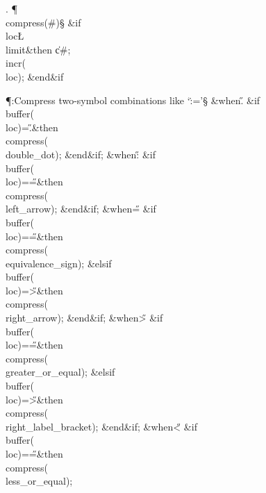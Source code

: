 .
\Y\P\4\D\\{compress}\?\1(\?\#\?\2)\S\?\6
\&{if}\1\1\8\\{loc}\?\L\?\\{limit}\2\8\&{then}\6
\|c\?\K\?\#;\5
\\{incr}\?\1(\?\\{loc}\?\2)\?;\2\6
\&{end}\8\2\&{if}\1\par
\Y\P\?\4:Compress two-symbol combinations like `\.{:=}'\X\S\?\6
\4\&{when}\8\H{.}\KR\6
\&{if}\1\1\8\\{buffer}\?\1(\?\\{loc}\?\2)=\?\H{.}\2\8\&{then}\6
\\{compress}\?\1(\?\\{double\_dot}\?\2)\?;\2\6
\&{end}\8\2\&{if}\1;\6
\4\&{when}\8\H{:}\KR\6
\&{if}\1\1\8\\{buffer}\?\1(\?\\{loc}\?\2)=\?\H{=}\2\8\&{then}\6
\\{compress}\?\1(\?\\{left\_arrow}\?\2)\?;\2\6
\&{end}\8\2\&{if}\1;\6
\4\&{when}\8\H{=}\KR\6
\&{if}\1\1\8\\{buffer}\?\1(\?\\{loc}\?\2)=\?\H{=}\2\8\&{then}\6
\\{compress}\?\1(\?\\{equivalence\_sign}\?\2)\?;\6
\4\&{elsif}\1\8\\{buffer}\?\1(\?\\{loc}\?\2)=\?\H{>}\2\8\&{then}\6
\\{compress}\?\1(\?\\{right\_arrow}\?\2)\?;\2\6
\&{end}\8\2\&{if}\1;\6
\4\&{when}\8\H{>}\KR\6
\&{if}\1\1\8\\{buffer}\?\1(\?\\{loc}\?\2)=\?\H{=}\2\8\&{then}\6
\\{compress}\?\1(\?\\{greater\_or\_equal}\?\2)\?;\6
\4\&{elsif}\1\8\\{buffer}\?\1(\?\\{loc}\?\2)=\?\H{>}\2\8\&{then}\6
\\{compress}\?\1(\?\\{right\_label\_bracket}\?\2)\?;\2\6
\&{end}\8\2\&{if}\1;\6
\4\&{when}\8\H{<}\KR\6
\&{if}\1\1\8\\{buffer}\?\1(\?\\{loc}\?\2)=\?\H{=}\2\8\&{then}\6
\\{compress}\?\1(\?\\{less\_or\_equal}\?\2)\?;\6
